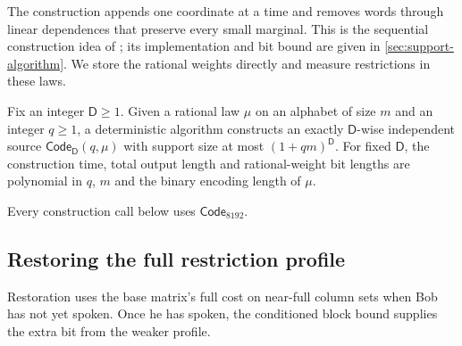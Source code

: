 \documentclass[11pt]{article} \usepackage[utf8]{inputenc}
\theoremstyle{plain} \newtheorem{theorem}{Theorem}[section]
\theoremstyle{definition} \newaliascnt{definition}{theorem}
\begin{document}
The construction appends one coordinate at a time and removes words through
linear dependences that preserve every small marginal. This is the sequential
construction idea of \citet{koller1994sample}; its implementation and bit bound
are given in \cref{sec:support-algorithm}. We store the rational weights
directly and measure restrictions in these laws.

\begin{lemma}\label{det:code}
Fix an integer $\mathsf D\ge1$. Given a rational law $\mu$ on an alphabet of
size $m$ and an integer $q\ge1$, a deterministic algorithm constructs an exactly
$\mathsf D$-wise independent source $\mathsf{Code}_{\mathsf D}(q,\mu)$ with
support size at most $(1+qm)^{\mathsf D}$.
For fixed $\mathsf D$, the construction time, total output length and
rational-weight bit lengths are polynomial in $q$, $m$ and the binary encoding
length of $\mu$.
\end{lemma}

Every construction call below uses $\mathsf{Code}_{8192}$.

\subsection{Restoring the full restriction profile}

Restoration uses the base matrix's full cost on near-full column sets when
Bob has not yet spoken. Once he has spoken, the conditioned block bound
supplies the extra bit from the weaker profile.
\end{document}
